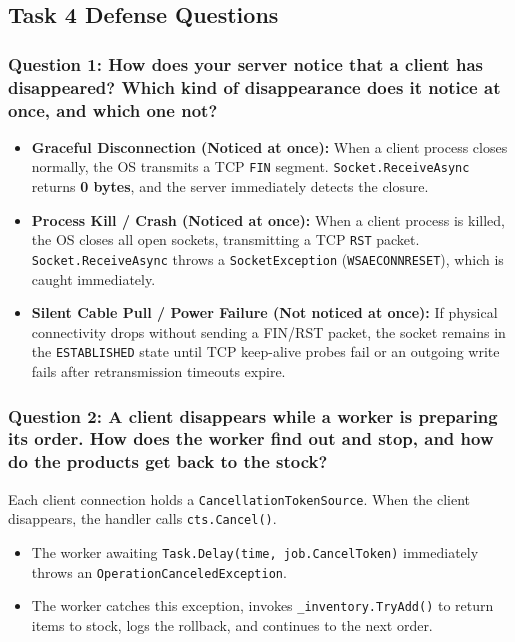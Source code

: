 \documentclass[12pt,a4paper]{article}
\begin{document}
\subsection{Task 4 Defense Questions}

\subsubsection{Question 1: How does your server notice that a client has disappeared? Which kind of disappearance does it notice at once, and which one not?}
\begin{itemize}
    \item \textbf{Graceful Disconnection (Noticed at once):} When a client process closes normally, the OS transmits a TCP \texttt{FIN} segment. \texttt{Socket.ReceiveAsync} returns \textbf{0 bytes}, and the server immediately detects the closure.
    \item \textbf{Process Kill / Crash (Noticed at once):} When a client process is killed, the OS closes all open sockets, transmitting a TCP \texttt{RST} packet. \texttt{Socket.ReceiveAsync} throws a \texttt{SocketException} (\texttt{WSAECONNRESET}), which is caught immediately.
    \item \textbf{Silent Cable Pull / Power Failure (Not noticed at once):} If physical connectivity drops without sending a FIN/RST packet, the socket remains in the \texttt{ESTABLISHED} state until TCP keep-alive probes fail or an outgoing write fails after retransmission timeouts expire.
\end{itemize}

\subsubsection{Question 2: A client disappears while a worker is preparing its order. How does the worker find out and stop, and how do the products get back to the stock?}
Each client connection holds a \texttt{CancellationTokenSource}. When the client disappears, the handler calls \texttt{cts.Cancel()}. 
\begin{itemize}
    \item The worker awaiting \texttt{Task.Delay(time, job.CancelToken)} immediately throws an \texttt{OperationCanceledException}.
    \item The worker catches this exception, invokes \texttt{\_inventory.TryAdd()} to return items to stock, logs the rollback, and continues to the next order.
\end{itemize}
\end{document}
